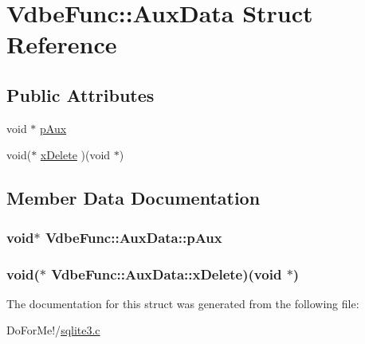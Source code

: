 \hypertarget{struct_vdbe_func_1_1_aux_data}{\section{Vdbe\-Func\-:\-:Aux\-Data Struct Reference}
\label{struct_vdbe_func_1_1_aux_data}
}
\subsection*{Public Attributes}
\begin{DoxyCompactItemize}
\item 
void $\ast$ \hyperlink{struct_vdbe_func_1_1_aux_data_ad2ceeac1dec76bbb661f6418ec582539}{p\-Aux}
\item 
void($\ast$ \hyperlink{struct_vdbe_func_1_1_aux_data_a6742f89d0634b5fc6684f245bac76fd5}{x\-Delete} )(void $\ast$)
\end{DoxyCompactItemize}


\subsection{Member Data Documentation}
\hypertarget{struct_vdbe_func_1_1_aux_data_ad2ceeac1dec76bbb661f6418ec582539}{
\subsubsection[{p\-Aux}]{\setlength{\rightskip}{0pt plus 5cm}void$\ast$ Vdbe\-Func\-::\-Aux\-Data\-::p\-Aux}}\label{struct_vdbe_func_1_1_aux_data_ad2ceeac1dec76bbb661f6418ec582539}
\hypertarget{struct_vdbe_func_1_1_aux_data_a6742f89d0634b5fc6684f245bac76fd5}{
\subsubsection[{x\-Delete}]{\setlength{\rightskip}{0pt plus 5cm}void($\ast$ Vdbe\-Func\-::\-Aux\-Data\-::x\-Delete)(void $\ast$)}}\label{struct_vdbe_func_1_1_aux_data_a6742f89d0634b5fc6684f245bac76fd5}


The documentation for this struct was generated from the following file\-:\begin{DoxyCompactItemize}
\item 
Do\-For\-Me!/\hyperlink{sqlite3_8c}{sqlite3.\-c}\end{DoxyCompactItemize}
